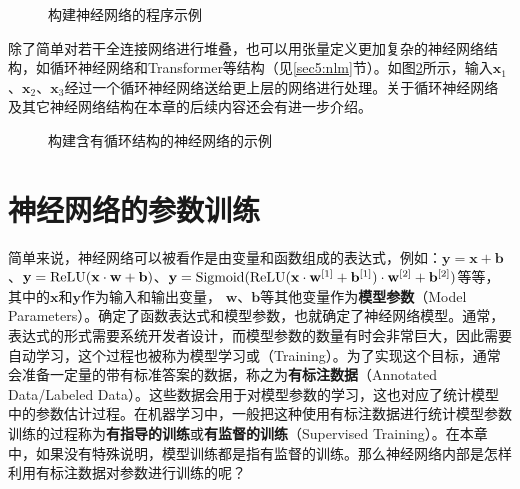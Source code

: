 \begin{figure}[htp]
\centering

\caption{构建神经网络的程序示例}
\label{fig:5-39}
\end{figure}

\parinterval 除了简单对若干全连接网络进行堆叠，也可以用张量定义更加复杂的神经网络结构，如循环神经网络和Transformer等结构（见\ref{sec5:nlm}节）。如图\ref{fig:5-41}所示，输入$ \mathbf x_1 $、$ \mathbf x_2 $、$ \mathbf x_3 $经过一个循环神经网络送给更上层的网络进行处理。关于循环神经网络及其它神经网络结构在本章的后续内容还会有进一步介绍。

\begin{figure}[htp]
\centering

\caption{构建含有循环结构的神经网络的示例}
\label{fig:5-41}
\end{figure}


\sectionnewpage
\section{神经网络的参数训练}

\parinterval 简单来说，神经网络可以被看作是由变量和函数组成的表达式，例如：$ \mathbf y=\mathbf x+\mathbf b $、$ \mathbf y={\rm{ReLU}}(\mathbf x\cdot \mathbf w+\mathbf b) $、$ \mathbf y={\rm{Sigmoid}}({\rm{ReLU}}(\mathbf x\cdot \mathbf w^{[1]}+\mathbf b^{[1]})\cdot \mathbf w^{[2]}+\mathbf b^{[2]}) $等等，其中的$ \mathbf x $和$ \mathbf y $作为输入和输出变量， $ \mathbf w $、$ \mathbf b $等其他变量作为{\small\sffamily\bfseries{模型参数}}（Model Parameters）。确定了函数表达式和模型参数，也就确定了神经网络模型。通常，表达式的形式需要系统开发者设计，而模型参数的数量有时会非常巨大，因此需要自动学习，这个过程也被称为模型学习或{\small{}}（Training）。为了实现这个目标，通常会准备一定量的带有标准答案的数据，称之为{\small\sffamily\bfseries{有标注数据}}（Annotated Data/Labeled Data）。这些数据会用于对模型参数的学习，这也对应了统计模型中的参数估计过程。在机器学习中，一般把这种使用有标注数据进行统计模型参数训练的过程称为{\small\sffamily\bfseries{有指导的训练}}或{\small\sffamily\bfseries{有监督的训练}}（Supervised Training）。在本章中，如果没有特殊说明，模型训练都是指有监督的训练。那么神经网络内部是怎样利用有标注数据对参数进行训练的呢？\\ \\

